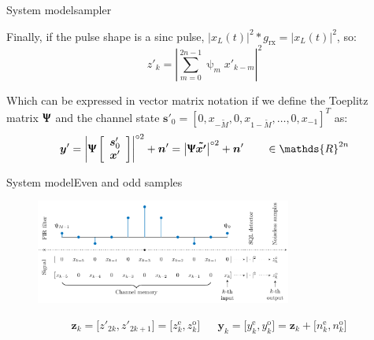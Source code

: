 \documentclass[en]{sdqbeamer}
\begin{document}
\begin{frame}{System model}{sampler}

Finally, if the pulse shape is a sinc pulse, $|x_L(t)|^2*g_\text{rx}=|x_L(t)|^2$, so:
\begin{equation}
z'_k=\left|\sum_{m=0}^{2n-1}\uppsi_mx'_{k-m}\right|^2
\end{equation}
 
Which can be expressed in vector matrix notation if we define the Toeplitz matrix $\bm \Uppsi$ and the channel state $\bm{s}'_0=[0,x_{-\widetilde{M}},0,x_{1-\widetilde{M}},\dotsc,0,x_{-1}]^T$ as:
\begin{align}
	\bm y' = \left|\bm \Uppsi \left[
\begin{array}{c}
\bm{s}'_0  \\
   \bm x'
\end{array}
\right]
\right|^{\circ2} + \bm n' = \left|\bm{ \Uppsi \tilde{x'}}\right|^{\circ2} +\bm n' \qquad \in \mathds{R}^{2n}
\end{align}


\end{frame}


\begin{frame}{System model}{Even and odd samples}

\begin{figure}[htbp]
\begin{center}
\includegraphics[width=0.75\textwidth]{Exp_even_odd_samp.pdf}
\end{center}
\end{figure}


\begin{align}
&\bm z_k= \bigl[z'_{2k},z'_{2k+1}\bigr]=\bigl[z_{k}^{\text{e}},z_{k}^{\text{o}}\bigr]
&&\bm y_k=\bigl[y_{k}^{\text{e}},y_{k}^{\text{o}}\bigr]=\bm z_k+\bigl[n_{k}^{\text{e}}, n_{k}^{\text{o}}\bigr]
\end{align}


\end{frame}
\end{document}

